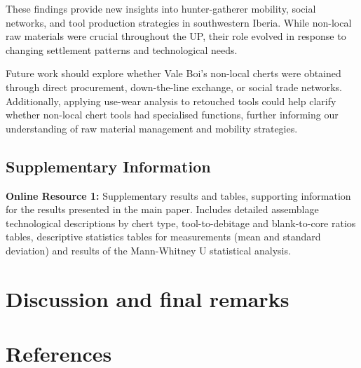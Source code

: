 \documentclass[
  a4paper,
  DIV=11,
  numbers=noendperiod]{scrreprt}
\begin{document}
These findings provide new insights into hunter-gatherer mobility,
social networks, and tool production strategies in southwestern Iberia.
While non-local raw materials were crucial throughout the UP, their role
evolved in response to changing settlement patterns and technological
needs.

Future work should explore whether Vale Boi's non-local cherts were
obtained through direct procurement, down-the-line exchange, or social
trade networks. Additionally, applying use-wear analysis to retouched
tools could help clarify whether non-local chert tools had specialised
functions, further informing our understanding of raw material
management and mobility strategies.

\section*{Supplementary Information}\label{supplementary-information-1}


\textbf{Online Resource 1:} Supplementary results and tables, supporting
information for the results presented in the main paper. Includes
detailed assemblage technological descriptions by chert type,
tool-to-debitage and blank-to-core ratios tables, descriptive statistics
tables for measurements (mean and standard deviation) and results of the
Mann-Whitney U statistical analysis.


\chapter{Discussion and final
remarks}\label{discussion-and-final-remarks}


\chapter*{References}\label{references}

\end{document}
